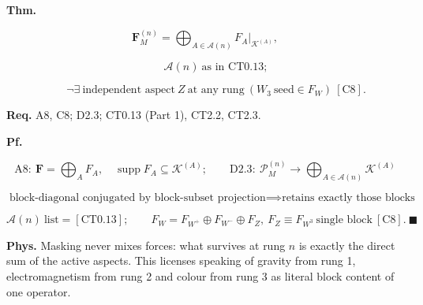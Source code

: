 \begin{theorem}\label{tag:CT2-4}
\textbf{Thm.}

\[
\mathbf F_M^{(n)}=\bigoplus_{A\in\mathcal A(n)}F_A\big|_{\mathcal K^{(A)}},
\]

\[
\qquad \mathcal A(n)\ \text{as in CT0.13};
\]

\[
\qquad \neg\exists\ \text{independent aspect}\ Z\ \text{at any rung}\ (W_3\ \text{seed}\in F_W)\ [\mathrm{C8}].
\]

\textbf{Req.} A8, C8; D2.3; CT0.13 (Part 1), CT2.2, CT2.3.

\textbf{Pf.}

\[
\mathrm{A8}:\ \mathbf F=\bigoplus_AF_A,\quad\operatorname{supp}F_A\subseteq\mathcal K^{(A)};\qquad
\mathrm{D2.3}:\ \mathcal P_M^{(n)}\to\bigoplus_{A\in\mathcal A(n)}\mathcal K^{(A)}
\]

\[
\text{block-diagonal conjugated by block-subset projection}\implies\text{retains exactly those blocks}
\]

\[
\mathcal A(n)\ \text{list}=[\mathrm{CT0.13}];\qquad F_W=F_{W^+}\oplus F_{W^-}\oplus F_Z,\ F_Z\equiv F_{W^3}\ \text{single block}\ [\mathrm{C8}].\ \blacksquare
\]

\textbf{Phys.} Masking never mixes forces: what survives at rung $n$ is exactly the direct sum of the active aspects. This licenses speaking of gravity from rung 1, electromagnetism from rung 2 and colour from rung 3 as literal block content of one operator.

\end{theorem}

